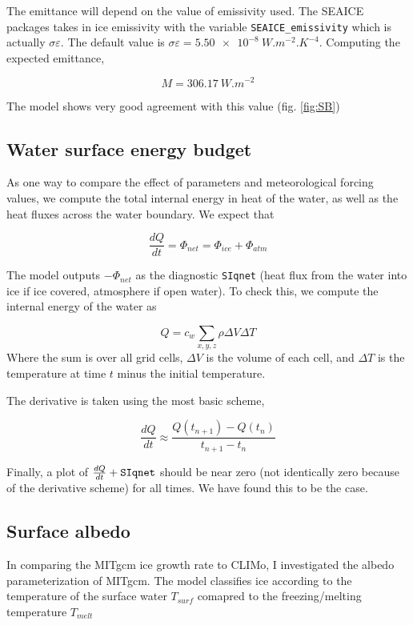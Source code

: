 \documentclass[11pt]{article}
\begin{document}
The emittance will depend on the value of emissivity used. The SEAICE packages takes in ice emissivity with the variable \verb|SEAICE_emissivity| which is actually $\sigma \varepsilon$. The default value is $\sigma \varepsilon = \SI{5.50e-8}{ W.m^{-2}.K^{-4}}$.  Computing the expected emittance, 

\begin{equation*}
M = \SI{306.17}{W.m^{-2}}
\end{equation*}

The model shows very good agreement with this value (fig. \ref{fig:SB})

\subsection{Water surface energy budget}
As one way to compare the effect of parameters and meteorological forcing values, we compute the total internal energy in heat of the water, as well as the heat fluxes across the water boundary. We expect that

\begin{equation}
\frac{d Q}{d t} = \Phi_{net} = \Phi_{ice} + \Phi_{atm}
\end{equation}

The model outputs $-\Phi_{net}$ as the diagnostic \verb|SIqnet| (heat flux from the water into ice if ice covered, atmosphere if open water). To check this, we compute the internal energy of the water as

\begin{equation}
Q = c_w \sum_{x, y, z} \rho \Delta V \Delta T
\end{equation}
Where the sum is over all grid cells, $\Delta V$ is the volume of each cell, and $\Delta T$ is the temperature at time $t$ minus the initial temperature.

The derivative is taken using the most basic scheme,

\begin{equation*}
\frac{d Q}{d t} \approx \frac{Q(t_{n+1}) - Q(t_n)}{t_{n+1} - t_n}
\end{equation*}

Finally, a plot of $\frac{d Q}{d t} + \verb|SIqnet|$ should be near zero (not identically zero because of the derivative scheme) for all times. We have found this to be the case.

\subsection{Surface albedo}
In comparing the MITgcm ice growth rate to CLIMo, I investigated the albedo parameterization of MITgcm. The model classifies ice according to the temperature of the surface water $T_{surf}$ comapred to the freezing/melting temperature $T_{melt}$
\end{document}
